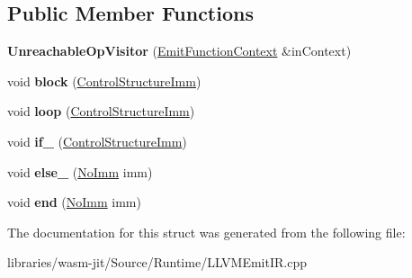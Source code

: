 \subsection*{Public Member Functions}
\begin{DoxyCompactItemize}
\item 
\mbox{\label{struct_l_l_v_m_j_i_t_1_1_unreachable_op_visitor_a15e87fa687b6a215ff692d868e462e97}} 
{\bfseries Unreachable\+Op\+Visitor} (\mbox{\hyperlink{struct_l_l_v_m_j_i_t_1_1_emit_function_context}{Emit\+Function\+Context}} \&in\+Context)
\item 
\mbox{\label{struct_l_l_v_m_j_i_t_1_1_unreachable_op_visitor_a07c7dc8184d294877606c06261269a4e}} 
void {\bfseries block} (\mbox{\hyperlink{struct_i_r_1_1_control_structure_imm}{Control\+Structure\+Imm}})
\item 
\mbox{\label{struct_l_l_v_m_j_i_t_1_1_unreachable_op_visitor_ab81fc4e8210d29ed17ba07da208f5640}} 
void {\bfseries loop} (\mbox{\hyperlink{struct_i_r_1_1_control_structure_imm}{Control\+Structure\+Imm}})
\item 
\mbox{\label{struct_l_l_v_m_j_i_t_1_1_unreachable_op_visitor_a3323e0bbb89c80b87dea3d47daa5304a}} 
void {\bfseries if\+\_\+} (\mbox{\hyperlink{struct_i_r_1_1_control_structure_imm}{Control\+Structure\+Imm}})
\item 
\mbox{\label{struct_l_l_v_m_j_i_t_1_1_unreachable_op_visitor_a4be12f2d832170ed33f00fcfb4dcdd43}} 
void {\bfseries else\+\_\+} (\mbox{\hyperlink{struct_i_r_1_1_no_imm}{No\+Imm}} imm)
\item 
\mbox{\label{struct_l_l_v_m_j_i_t_1_1_unreachable_op_visitor_aaaa25a28c94d3dbb07e5f22c4544c2c4}} 
void {\bfseries end} (\mbox{\hyperlink{struct_i_r_1_1_no_imm}{No\+Imm}} imm)
\end{DoxyCompactItemize}


The documentation for this struct was generated from the following file\+:\begin{DoxyCompactItemize}
\item 
libraries/wasm-\/jit/\+Source/\+Runtime/L\+L\+V\+M\+Emit\+I\+R.\+cpp\end{DoxyCompactItemize}
